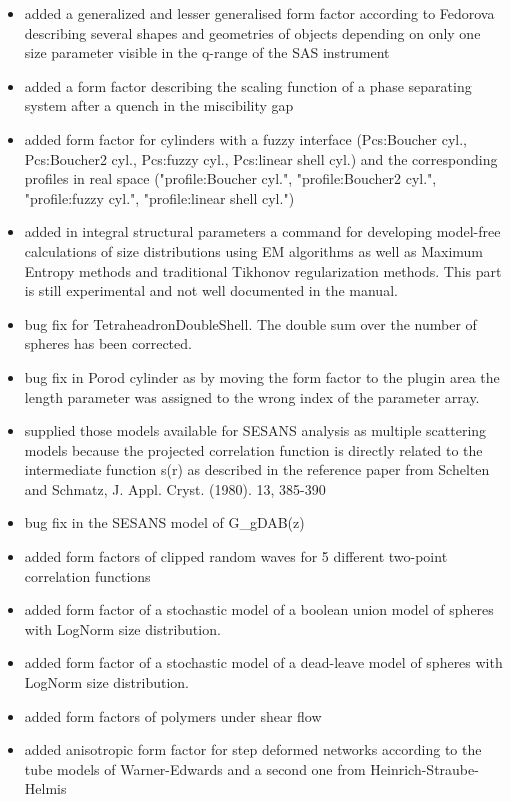 \begin{description}
\begin{itemize}
    \item added a generalized and lesser generalised form factor according to Fedorova describing several shapes and geometries of objects depending on only one size parameter visible in the q-range of the SAS instrument
    \item added a form factor describing the scaling function of a phase separating system after a quench in the miscibility gap
    \item added form factor for cylinders with a fuzzy interface (Pcs:Boucher cyl., Pcs:Boucher2 cyl., Pcs:fuzzy cyl., Pcs:linear shell cyl.) and the corresponding profiles in real space ("profile:Boucher cyl.", "profile:Boucher2 cyl.", "profile:fuzzy cyl.", "profile:linear shell cyl.")
    \item added in integral structural parameters a command for developing model-free calculations of size distributions using EM algorithms as well as Maximum Entropy methods and traditional Tikhonov regularization methods. This part is still experimental and not well documented in the manual.
    \item bug fix for TetraheadronDoubleShell. The double sum over the number of spheres has been corrected.
    \item bug fix in Porod cylinder as by moving the form factor to the plugin area the length parameter was assigned to the wrong index of the parameter array.
    \item supplied those models available for SESANS analysis as multiple scattering models because the projected correlation function is directly related to the intermediate function s(r) as described in the reference paper from Schelten and Schmatz, J. Appl. Cryst. (1980). 13, 385-390
    \item bug fix in the SESANS model of G\_gDAB(z)
    \item added form factors of clipped random waves for 5 different two-point correlation functions
    \item added form factor of a stochastic model of a boolean union model of spheres with LogNorm size distribution.
    \item added form factor of a stochastic model of a dead-leave model of spheres with LogNorm size distribution.
    \item added form factors of polymers under shear flow
    \item added anisotropic form factor for step deformed networks according to the tube models of Warner-Edwards and a second one from Heinrich-Straube-Helmis

\end{itemize}
\end{description}
